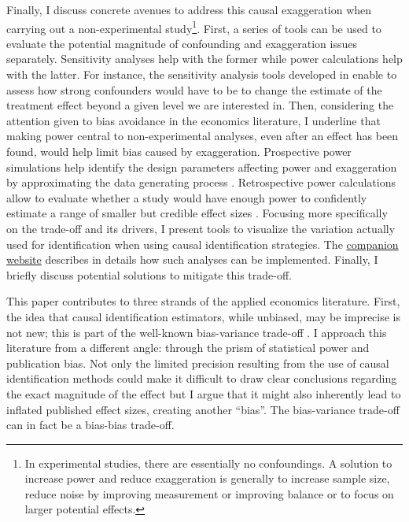 			Finally, I discuss concrete avenues to address this causal exaggeration when carrying out a non-experimental study\footnote{In experimental studies, there are essentially no confoundings. A solution to increase power and reduce exaggeration is generally to increase sample size, reduce noise by improving measurement or improving balance or to focus on larger potential effects.}. First, a series of tools can be used to evaluate the potential magnitude of confounding and exaggeration issues separately. Sensitivity analyses help with the former while power calculations help with the latter. %
			For instance, the sensitivity analysis tools developed in \cite{cinelli_making_2020} enable to assess how strong confounders would have to be to change the estimate of the treatment effect beyond a given level we are interested in. Then, considering the attention given to bias avoidance in the economics literature, I underline that making power central to non-experimental analyses, even after an effect has been found, would help limit bias caused by exaggeration. Prospective power simulations help identify the design parameters affecting power and exaggeration by approximating the data generating process \citep{gelman_regression_2020, black_simulated_2021}. Retrospective power calculations allow to evaluate whether a study would have enough power to confidently estimate a range of smaller but credible effect sizes \citep{gelman_beyond_2014, stommes_reliability_2021}.
			Focusing more specifically on the trade-off and its drivers, I present tools to visualize the variation actually used for identification when using causal identification strategies. The \href{https://vincentbagilet.github.io/causal_exaggeration/}{companion website} describes in details how such analyses can be implemented. Finally, I briefly discuss potential solutions to mitigate this trade-off.
						
			This paper contributes to three strands of the applied economics literature. First, the idea that causal identification estimators, while unbiased, may be imprecise is not new; this is part of the well-known bias-variance trade-off \citep{imbens_optimal_2012, deaton_understanding_2018, hernan_causal_2020, ravallion_should_2020}. I approach this literature from a different angle: through the prism of statistical power and publication bias. Not only the limited precision resulting from the use of causal identification methods could make it difficult to draw clear conclusions regarding the exact magnitude of the effect but I argue that it might also inherently lead to inflated published effect sizes, creating another ``bias''. The bias-variance trade-off can in fact be a bias-bias trade-off.
			
